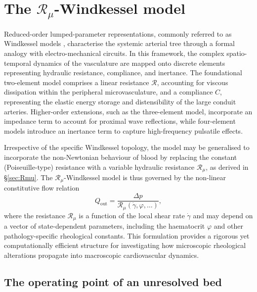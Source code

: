 \documentclass[lineno]{jfm}
\begin{document}
\section{The $\mathcal{R}_{\mu}$-Windkessel model}
\label{sec:RmuWindkessel}

Reduced-order lumped-parameter representations, commonly referred to as Windkessel models \citep{frank1990basic,olufsen2003deriving,westerhof2009arterial}, characterise the systemic arterial tree through a formal analogy with electro-mechanical circuits. In this framework, the complex spatio-temporal dynamics of the vasculature are mapped onto discrete elements representing hydraulic resistance, compliance, and inertance. The foundational two-element model comprises a linear resistance $\mathcal{R}$, accounting for viscous dissipation within the peripheral microvasculature, and a compliance $C$, representing the elastic energy storage and distensibility of the large conduit arteries. Higher-order extensions, such as the three-element model, incorporate an impedance term to account for proximal wave reflections, while four-element models introduce an inertance term to capture high-frequency pulsatile effects.

Irrespective of the specific Windkessel topology, the model may be generalised to incorporate the non-Newtonian behaviour of blood by replacing the constant (Poiseuille-type) resistance with a variable hydraulic resistance $\mathcal{R}_{\mu}$, as derived in \S\ref{sec:Rmu}. The $\mathcal{R}_{\mu}$-Windkessel model is thus governed by the non-linear constitutive flow relation
\begin{equation}
Q_{\mathrm{out}}=\frac{\Delta p}{\mathcal{R}_{\mu}(\dot{\gamma}, \varphi, \dots)},
\label{eq:WK_Rmu_outflow}
\end{equation}
where the resistance $\mathcal{R}_{\mu}$ is a function of the local shear rate $\dot{\gamma}$ and may depend on a vector of state-dependent parameters, including the haematocrit $\varphi$ and other pathology-specific rheological constants. This formulation provides a rigorous yet computationally efficient structure for investigating how microscopic rheological alterations propagate into macroscopic cardiovascular dynamics.

\subsection{The operating point of an unresolved bed}
\label{sec:operating-point}
\end{document}
